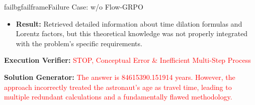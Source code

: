 \begin{small}
\begin{center}
\begin{casebox}{failbg}{failframe}{Failure Case: \model w/o Flow-GRPO}
\begin{itemize}[nosep, leftmargin=*]
        \item \textbf{Result:} {Retrieved detailed information about time dilation formulas and Lorentz factors, but this theoretical knowledge was not properly integrated with the problem's specific requirements.}
    \end{itemize}

    \vspace{1em}

    \textbf{Execution Verifier:} \textcolor{red}{STOP, Conceptual Error \& Inefficient Multi-Step Process}

    \vspace{1em}

    \textbf{Solution Generator:} \textcolor{red}{The answer is 84615390.151914 years. However, the approach incorrectly treated the astronaut's age as travel time, leading to multiple redundant calculations and a fundamentally flawed methodology.}

\end{casebox}

\end{center}
\end{small}
